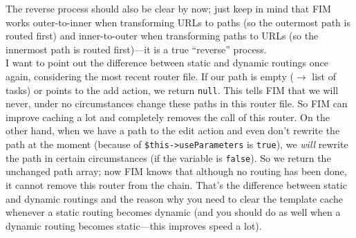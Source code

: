 \documentclass{scrartcl}
\begin{document}
      The reverse process should also be clear by now; just keep in mind that FIM works outer-to-inner when transforming URLs to paths (so the outermost path is routed first) and inner-to-outer when transforming paths to URLs (so the innermost path is routed first)---it is a true ``reverse'' process. \\
      I want to point out the difference between static and dynamic routings once again, considering the most recent router file. If our path is empty ($\rightarrow$ list of tasks) or points to the add action, we return \lstinline!null!. This tells FIM that we will never, under no circumstances change these paths in this router file. So FIM can improve caching a lot and completely removes the call of this router. On the other hand, when we have a path to the edit action and even don't rewrite the path at the moment (because of \lstinline!$this->useParameters! is \lstinline!true!), we \emph{will} rewrite the path in certain circumstances (if the variable is \lstinline!false!). So we return the unchanged path array; now FIM knows that although no routing has been done, it cannot remove this router from the chain. That's the difference between static and dynamic routings and the reason why you need to clear the template cache whenever a static routing becomes dynamic (and you should do as well when a dynamic routing becomes static---this improves speed a lot).
\end{document}
